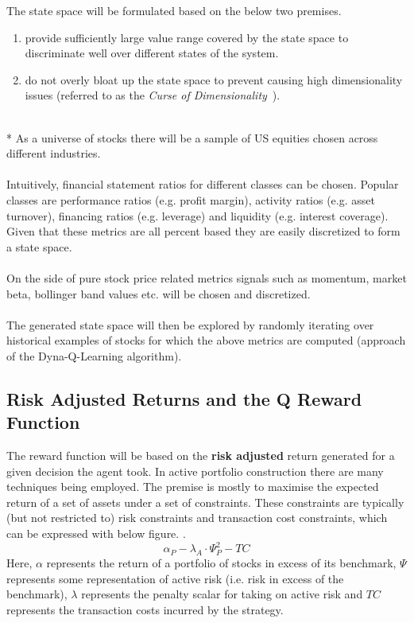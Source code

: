 \documentclass[dvips,12pt]{article}
\begin{document}
The state space will be formulated based on the below two premises.
\begin{enumerate}
	\item provide sufficiently large value range covered by the state space to discriminate well over different states of the system.
	\item do not overly bloat up the state space to prevent causing high dimensionality issues (referred to as the \emph{Curse of Dimensionality}~\cite{rojas2015}).
\end{enumerate}
~\\*
As a universe of stocks there will be a sample of US equities chosen across different industries.
\\\\
Intuitively, financial statement ratios for different classes can be chosen. Popular classes are performance ratios (e.g. profit margin), activity ratios (e.g. asset turnover), financing ratios (e.g. leverage) and liquidity (e.g. interest coverage). Given that these metrics are all percent based they are easily discretized to form a state space.
\\\\
On the side of pure stock price related metrics signals such as momentum, market beta, bollinger band values etc. will be chosen and discretized.
\\\\
The generated state space will then be explored by randomly iterating over historical examples of stocks for which the above metrics are computed (approach of the Dyna-Q-Learning algorithm). 

\subsection*{Risk Adjusted Returns and the Q Reward Function}
The reward function will be based on the \textbf{risk adjusted} return generated for a given decision the agent took.
In active portfolio construction there are many techniques being employed. The premise is mostly to maximise the expected return of a set of assets under a set of constraints. These constraints are typically (but not restricted to) risk constraints and transaction cost constraints, which can be expressed with below figure. \cite{grinoldkahn1999}.
\begin{equation}
	\alpha_P - \lambda_A \cdot \Psi_P^2 - TC
\end{equation}
Here, $\alpha$ represents the return of a portfolio of stocks in excess of its benchmark, $\Psi$ represents some representation of active risk (i.e. risk in excess of the benchmark), $\lambda$ represents the penalty scalar for taking on active risk and $TC$ represents the transaction costs incurred by the strategy.
\end{document}
